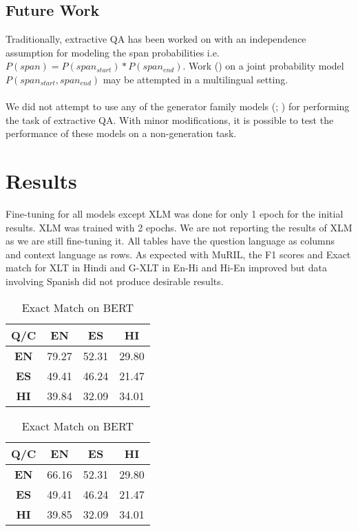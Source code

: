 \documentclass[12pt]{article}   %
\begin{document}
\subsection{Future Work}
Traditionally, extractive QA has been worked on with an independence assumption for modeling the span probabilities i.e. $P(span) = P(span_{start}) * P(span_{end})$. Work (\cite{fajcik-etal-2021-rethinking}) on a joint probability model $P(span_{start}, span_{end})$ may be attempted in a multilingual setting.
\\ \\
We did not attempt to use any of the generator family models (\cite{xue-etal-2021-mt5}; \cite{dabre-etal-2022-indicbart}) for performing the task of extractive QA. With minor modifications, it is possible to test the performance of these models on a non-generation task.


\section{Results}

Fine-tuning for all models except XLM was done for only 1 epoch for the initial results. XLM was trained with 2 epochs. We are not reporting the results of XLM as we are still fine-tuning it. All tables have the question language as columns and context language as rows. As expected with MuRIL, the F1 scores and Exact match for XLT in Hindi and G-XLT in En-Hi and Hi-En improved but data involving Spanish did not produce desirable results. 

 \begin{table}[h]
        \begin{minipage}{0.5\textwidth}
            \centering
		\begin{tabular}{|c|c|c|c|}
			\hline
 			\textbf{Q/C} &  \textbf{EN} &  \textbf{ES} &  \textbf{HI} \\
			\hline
			 \textbf{EN} & 79.27 & 52.31 & 29.80 \\
			\hline
			\textbf{ES} & 49.41 & 46.24 & 21.47 \\
			\hline
			\textbf{HI} & 39.84 & 32.09 & 34.01 \\
			\hline
		\end{tabular}
		\caption{F1 on BERT}
	\end{minipage}%
        \hfill
	\begin{minipage}{0.5\textwidth}
         	\centering
			\begin{tabular}{|c|c|c|c|}
				\hline
				 \textbf{Q/C} &  \textbf{EN} &  \textbf{ES} &  \textbf{HI} \\
				\hline
				\textbf{EN} & 66.16& 52.31 & 29.80 \\
				 \hline
				\textbf{ES} & 49.41 & 46.24 & 21.47 \\
				\hline
				 \textbf{HI} & 39.85& 32.09 & 34.01\\
				 \hline
			\end{tabular}
			\caption{Exact Match on BERT}
	\end{minipage}%
\end{table}
\end{document}
